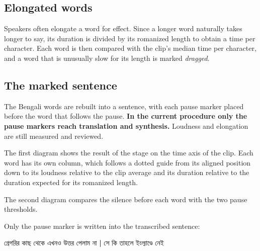 \subsection{Elongated words}
Speakers often elongate a word for effect. Since a longer word naturally takes longer to say, its duration is divided by its romanized length to obtain a time per character. Each word is then compared with the clip's median time per character, and a word that is unusually slow for its length is marked \emph{dragged}.

\subsection{The marked sentence}
The Bengali words are rebuilt into a sentence, with each pause marker placed before the word that follows the pause. \textbf{In the current procedure only the pause markers reach translation and synthesis.} Loudness and elongation are still measured and reviewed.

\begin{example}
The first diagram shows the result of the stage on the time axis of the clip. Each word has its own column, which follows a dotted guide from its aligned position down to its loudness relative to the clip average and its duration relative to the duration expected for its romanized length.

\begin{center}

\end{center}

The second diagram compares the silence before each word with the two pause thresholds.

\begin{center}

\end{center}

Only the pause marker is written into the transcribed sentence:

\smallskip
\begin{center}{\bn গ্রেগরির কাছ থেকে এখনও উত্তর পেলাম না {\color{red!75!black}\textbf{|}} সে কি তাহলে ইংল্যাণ্ডে নেই}\end{center}
\end{example}

